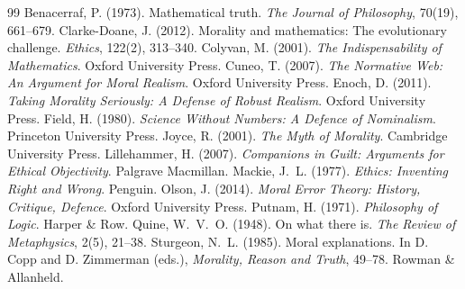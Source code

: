 \documentclass{situationist-preprint}
\begin{document}
\begin{thebibliography}{99}\small
{} Benacerraf, P. (1973). Mathematical truth. \emph{The Journal of Philosophy}, 70(19), 661--679.
 Clarke-Doane, J. (2012). Morality and mathematics: The evolutionary challenge. \emph{Ethics}, 122(2), 313--340.
 Colyvan, M. (2001). \emph{The Indispensability of Mathematics}. Oxford University Press.
 Cuneo, T. (2007). \emph{The Normative Web: An Argument for Moral Realism}. Oxford University Press.
 Enoch, D. (2011). \emph{Taking Morality Seriously: A Defense of Robust Realism}. Oxford University Press.
 Field, H. (1980). \emph{Science Without Numbers: A Defence of Nominalism}. Princeton University Press.
 Joyce, R. (2001). \emph{The Myth of Morality}. Cambridge University Press.
 Lillehammer, H. (2007). \emph{Companions in Guilt: Arguments for Ethical Objectivity}. Palgrave Macmillan.
 Mackie, J.~L. (1977). \emph{Ethics: Inventing Right and Wrong}. Penguin.
 Olson, J. (2014). \emph{Moral Error Theory: History, Critique, Defence}. Oxford University Press.
 Putnam, H. (1971). \emph{Philosophy of Logic}. Harper \& Row.
 Quine, W.~V.~O. (1948). On what there is. \emph{The Review of Metaphysics}, 2(5), 21--38.
 Sturgeon, N.~L. (1985). Moral explanations. In D. Copp and D. Zimmerman (eds.), \emph{Morality, Reason and Truth}, 49--78. Rowman \& Allanheld.
\end{thebibliography}
\end{document}
